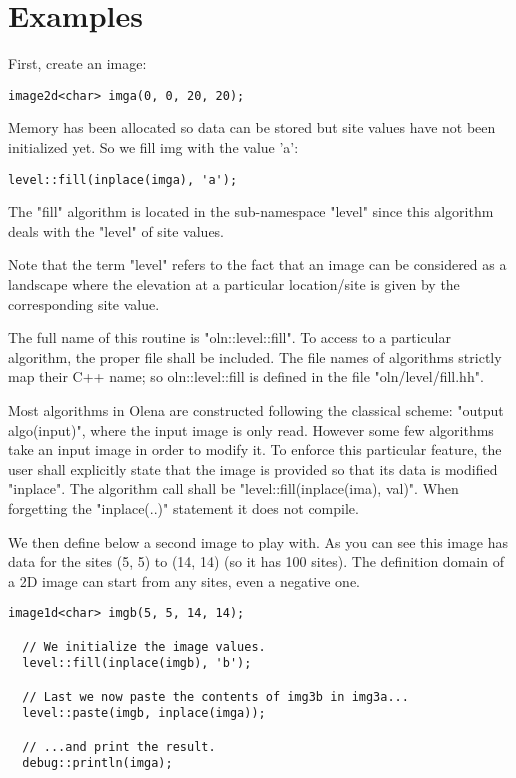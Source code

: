 \documentclass{report}
\begin{document}
\section{Examples}
First, create an image:
\begin{lstlisting}[frame=single]
  image2d<char> imga(0, 0, 20, 20);
\end{lstlisting}

Memory has been allocated so data can be stored but site values
have not been initialized yet.  So we fill img with the value 'a':
\begin{lstlisting}[frame=single]
  level::fill(inplace(imga), 'a');
\end{lstlisting}

The "fill" algorithm is located in the sub-namespace "level" since this
algorithm deals with the "level" of site values.

Note that the term "level" refers to the fact that an image can be considered as
a landscape where the elevation at a particular location/site is given by
the corresponding site value.

The full name of this routine is "oln::level::fill".  To access to a particular
algorithm, the proper file shall be included. The file names of algorithms
strictly map their C++ name; so oln::level::fill is defined in the file
"oln/level/fill.hh".

Most algorithms in Olena are constructed following the classical scheme: "output
algo(input)", where the input image is only read. However some few algorithms
take an input image in order to modify it.  To enforce this particular feature,
the user shall explicitly state that the image is provided so that its data is
modified "inplace". The algorithm call shall be "level::fill(inplace(ima),
val)". When forgetting the "inplace(..)" statement it does not compile.

We then define below a second image to play with.  As you can see this image has
data for the sites (5, 5) to (14, 14) (so it has 100 sites).  The definition
domain of a 2D image can start from any sites, even a negative one.

\begin{lstlisting}[frame=single]
  image1d<char> imgb(5, 5, 14, 14);

  // We initialize the image values.
  level::fill(inplace(imgb), 'b');

  // Last we now paste the contents of img3b in img3a...
  level::paste(imgb, inplace(imga));

  // ...and print the result.
  debug::println(imga);
\end{lstlisting}
\end{document}
